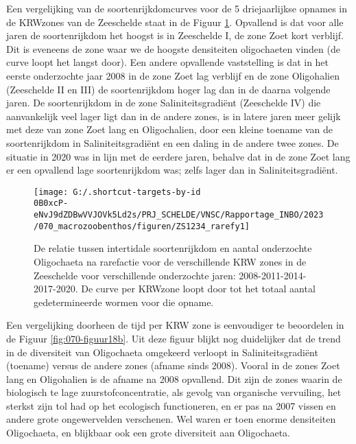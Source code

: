 \documentclass[twoside]{extreport}
\begin{document}
Een vergelijking van de soortenrijkdomcurves voor de 5 driejaarlijkse
opnames in de KRWzones van de Zeeschelde staat in de Figuur
\ref{fig:070-figuur18}. Opvallend is dat voor alle jaren de
soortenrijkdom het hoogst is in Zeeschelde I, de zone Zoet kort
verblijf. Dit is eveneens de zone waar we de hoogste densiteiten
oligochaeten vinden (de curve loopt het langst door). Een andere
opvallende vaststelling is dat in het eerste onderzochte jaar 2008 in de
zone Zoet lag verblijf en de zone Oligohalien (Zeeschelde II en III) de
soortenrijkdom hoger lag dan in de daarna volgende jaren. De
soortenrijkdom in de zone Saliniteitsgradiënt (Zeeschelde IV) die
aanvankelijk veel lager ligt dan in de andere zones, is in latere jaren
meer gelijk met deze van zone Zoet lang en Oligochalien, door een kleine
toename van de soortenrijkdom in Saliniteitsgradiënt en een daling in de
andere twee zones. De situatie in 2020 was in lijn met de eerdere jaren,
behalve dat in de zone Zoet lang er een opvallend lage soortenrijkdom
was; zelfs lager dan in Saliniteitsgradiënt.

\begin{figure}[H]

{\centering \texttt{[image: G:/.shortcut-targets-by-id\\0B0xcP-eNvJ9dZDBwVVJOVk5Ld2s/PRJ\_SCHELDE/VNSC/Rapportage\_INBO/2023/070\_macrozoobenthos/figuren/ZS1234\_rarefy1]} 

}

\caption{De relatie tussen intertidale soortenrijkdom en aantal onderzochte Oligochaeta na rarefactie voor de verschillende KRW zones in de Zeeschelde voor verschillende onderzochte jaren: 2008-2011-2014-2017-2020. De curve per KRWzone loopt door tot het totaal aantal gedetermineerde wormen voor die opname.}\label{fig:070-figuur18}
\end{figure}

Een vergelijking doorheen de tijd per KRW zone is eenvoudiger te
beoordelen in de Figuur \ref{fig:070-figuur18b}. Uit deze figuur blijkt
nog duidelijker dat de trend in de diversiteit van Oligochaeta omgekeerd
verloopt in Saliniteitsgradiënt (toename) versus de andere zones (afname
sinds 2008). Vooral in de zones Zoet lang en Oligohalien is de afname na
2008 opvallend. Dit zijn de zones waarin de biologisch te lage
zuurstofconcentratie, als gevolg van organische vervuiling, het sterkst
zijn tol had op het ecologisch functioneren, en er pas na 2007 vissen en
andere grote ongewervelden verschenen. Wel waren er toen enorme
densiteiten Oligochaeta, en blijkbaar ook een grote diversiteit aan
Oligochaeta.
\end{document}
